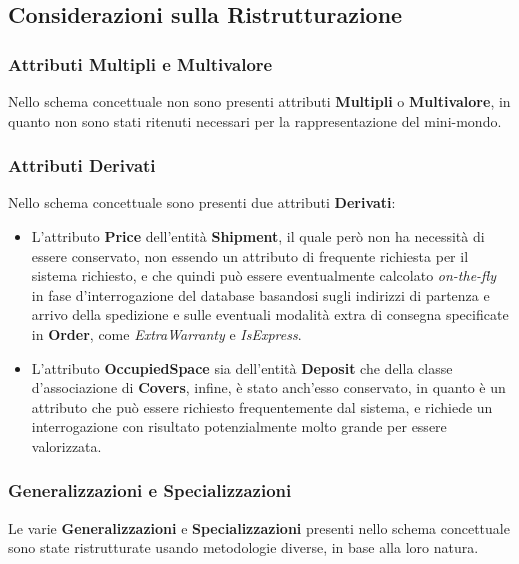 \subsection{Considerazioni sulla Ristrutturazione}

\subsubsection{Attributi Multipli e Multivalore}

Nello schema concettuale non sono presenti attributi \textbf{Multipli} o \textbf{Multivalore}, in quanto non sono stati ritenuti necessari per la rappresentazione del mini-mondo.

\subsubsection{Attributi Derivati}

Nello schema concettuale sono presenti due attributi \textbf{Derivati}:

\begin{itemize}
  \item L'attributo \textbf{Price} dell'entità \textbf{Shipment}, il quale però non ha necessità di essere conservato, non essendo un attributo di frequente richiesta per il sistema richiesto, e che quindi può essere eventualmente calcolato \textit{on-the-fly} in fase d'interrogazione del database basandosi sugli indirizzi di partenza e arrivo della spedizione e sulle eventuali modalità extra di consegna specificate in \textbf{Order}, come \textit{ExtraWarranty} e \textit{IsExpress}.
  \item L'attributo \textbf{OccupiedSpace} sia dell'entità \textbf{Deposit} che della classe d'associazione di \textbf{Covers}, infine, è stato anch'esso conservato, in quanto è un attributo che può essere richiesto frequentemente dal sistema, e richiede un interrogazione con risultato potenzialmente molto grande per essere valorizzata. 
\end{itemize}

\subsubsection{Generalizzazioni e Specializzazioni}

Le varie \textbf{Generalizzazioni} e \textbf{Specializzazioni} presenti nello schema concettuale sono state ristrutturate usando metodologie diverse, in base alla loro natura.

